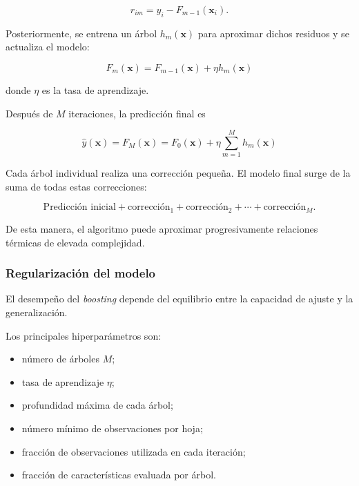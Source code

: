 \begin{equation}
r_{im}
=
y_i-F_{m-1}(\mathbf{x}_i).
\end{equation}

Posteriormente, se entrena un árbol $h_m(\mathbf{x})$ para aproximar dichos residuos y se actualiza el modelo:

\begin{equation}
\boxed{
F_m(\mathbf{x})
=
F_{m-1}(\mathbf{x})
+
\eta h_m(\mathbf{x})
}
\label{eq:gradient_boosting}
\end{equation}

donde $\eta$ es la tasa de aprendizaje.

Después de $M$ iteraciones, la predicción final es

\begin{equation}
\boxed{
\hat{y}(\mathbf{x})
=
F_M(\mathbf{x})
=
F_0(\mathbf{x})
+
\eta
\sum_{m=1}^{M}
h_m(\mathbf{x})
}
\end{equation}

\begin{tcolorbox}[
title=Idea fundamental del boosting,
colback=green!4,
colframe=green!55!black
]
Cada árbol individual realiza una corrección pequeña. El modelo final surge de la suma de todas estas correcciones:

\[
\text{Predicción inicial}
+
\text{corrección}_{1}
+
\text{corrección}_{2}
+
\cdots
+
\text{corrección}_{M}.
\]

De esta manera, el algoritmo puede aproximar progresivamente relaciones térmicas de elevada complejidad.
\end{tcolorbox}

\subsubsection{Regularización del modelo}

El desempeño del \textit{boosting} depende del equilibrio entre la capacidad de ajuste y la generalización.

Los principales hiperparámetros son:

\begin{itemize}
    \item número de árboles $M$;
    \item tasa de aprendizaje $\eta$;
    \item profundidad máxima de cada árbol;
    \item número mínimo de observaciones por hoja;
    \item fracción de observaciones utilizada en cada iteración;
    \item fracción de características evaluada por árbol.
\end{itemize}

